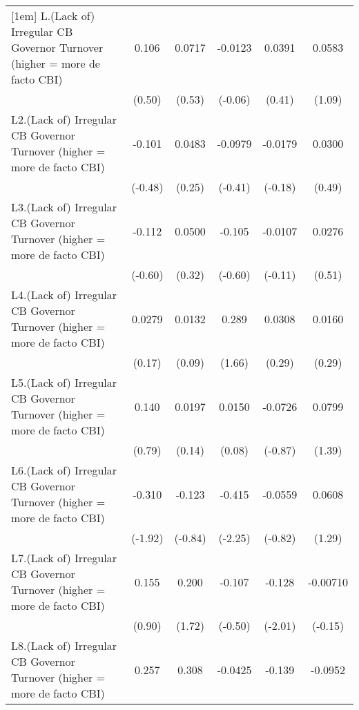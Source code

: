 {\begin{longtable}{l*{5}{c}}
[1em]
L.(Lack of) Irregular CB Governor Turnover (higher = more de facto CBI)&    0.106         &   0.0717         &  -0.0123         &   0.0391         &   0.0583         \\
                &   (0.50)         &   (0.53)         &  (-0.06)         &   (0.41)         &   (1.09)         \\
[1em]
L2.(Lack of) Irregular CB Governor Turnover (higher = more de facto CBI)&   -0.101         &   0.0483         &  -0.0979         &  -0.0179         &   0.0300         \\
                &  (-0.48)         &   (0.25)         &  (-0.41)         &  (-0.18)         &   (0.49)         \\
[1em]
L3.(Lack of) Irregular CB Governor Turnover (higher = more de facto CBI)&   -0.112         &   0.0500         &   -0.105         &  -0.0107         &   0.0276         \\
                &  (-0.60)         &   (0.32)         &  (-0.60)         &  (-0.11)         &   (0.51)         \\
[1em]
L4.(Lack of) Irregular CB Governor Turnover (higher = more de facto CBI)&   0.0279         &   0.0132         &    0.289         &   0.0308         &   0.0160         \\
                &   (0.17)         &   (0.09)         &   (1.66)         &   (0.29)         &   (0.29)         \\
[1em]
L5.(Lack of) Irregular CB Governor Turnover (higher = more de facto CBI)&    0.140         &   0.0197         &   0.0150         &  -0.0726         &   0.0799         \\
                &   (0.79)         &   (0.14)         &   (0.08)         &  (-0.87)         &   (1.39)         \\
[1em]
L6.(Lack of) Irregular CB Governor Turnover (higher = more de facto CBI)&   -0.310         &   -0.123         &   -0.415\sym{*}  &  -0.0559         &   0.0608         \\
                &  (-1.92)         &  (-0.84)         &  (-2.25)         &  (-0.82)         &   (1.29)         \\
[1em]
L7.(Lack of) Irregular CB Governor Turnover (higher = more de facto CBI)&    0.155         &    0.200         &   -0.107         &   -0.128\sym{*}  & -0.00710         \\
                &   (0.90)         &   (1.72)         &  (-0.50)         &  (-2.01)         &  (-0.15)         \\
[1em]
L8.(Lack of) Irregular CB Governor Turnover (higher = more de facto CBI)&    0.257         &    0.308\sym{*}  &  -0.0425         &   -0.139\sym{*}  &  -0.0952         \\

\end{longtable}}
